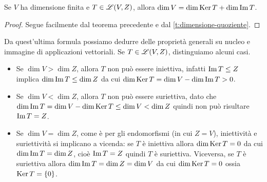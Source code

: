 \begin{corollario} \label{cor:nullita-rango}
	Se $V$ ha dimensione finita e $T\in\mathscr L(V,Z)$, allora $\dim V=\dim\operatorname{Ker} T+\dim\operatorname{Im} T$.
\end{corollario}
\begin{proof}
	Segue facilmente dal teorema precedente e dal \ref{t:dimensione-quoziente}.
\end{proof}
Da quest'ultima formula possiamo dedurre delle proprietà generali su nucleo e immagine di applicazioni vettoriali.
Se $T\in\mathscr L(V,Z)$, distinguiamo alcuni casi.
\begin{itemize}
	\item Se $\dim V>\dim Z$, allora $T$ non può essere iniettiva, infatti $\operatorname{Im} T\le Z$ implica $\dim\operatorname{Im} T\le\dim Z$ da cui $\dim\operatorname{Ker} T=\dim V-\dim\operatorname{Im} T>0$.
	\item Se $\dim V<\dim Z$, allora $T$ non può essere suriettiva, dato che $\dim\operatorname{Im} T=\dim V-\dim\operatorname{Ker} T\le\dim V<\dim Z$ quindi non può risultare $\operatorname{Im} T=Z$.
	\item Se $\dim V=\dim Z$, come è per gli endomorfismi (in cui $Z=V$), iniettività e suriettività si implicano a vicenda: se $T$ è iniettiva allora $\dim\operatorname{Ker} T=0$ da cui $\dim\operatorname{Im} T=\dim Z$, cioè $\operatorname{Im} T=Z$ quindi $T$ è suriettiva.
		Viceversa, se $T$ è suriettiva allora $\dim\operatorname{Im} T=\dim Z=\dim V$ da cui $\dim\operatorname{Ker} T=0$ ossia $\operatorname{Ker} T=\{0\}$.
\end{itemize}

